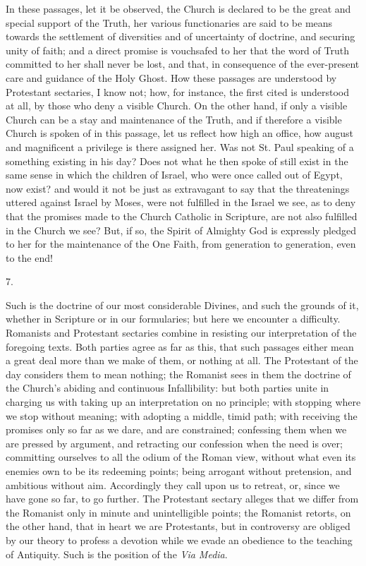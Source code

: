 In these passages, let it be observed, the Church is declared to be
the great and special support of the Truth, her various functionaries
are said to be means towards the settlement of diversities and of
uncertainty of doctrine, and securing unity of faith; and a direct
promise is vouchsafed to her that the word of Truth committed to her
shall never be lost, and that, in consequence of the ever-present care
and guidance of the Holy Ghost. How these passages are understood by
Protestant sectaries, I know not; how, for instance, the first cited
is understood at all, by those who deny a visible Church. On the other
hand, if only a visible Church can be a stay and maintenance of the
Truth, and if therefore a visible Church is spoken of in this
passage, let us reflect how high an office, how august and magnificent
a privilege is there assigned her. Was not St. Paul speaking of a
something existing in his day? Does not what he then spoke of still
exist in the same sense in which the children of Israel, who were once
called out of Egypt, now exist? and would it not be just as
extravagant to say that the threatenings uttered against Israel by
Moses, were not fulfilled in the Israel we see, as to deny that the
promises made to the Church Catholic in Scripture, are not also
fulfilled in the Church we see? But, if so, the Spirit of Almighty God
is expressly pledged to her for the maintenance of the One Faith, from
generation to generation, even to the end!

7.

Such is the doctrine of our most considerable Divines, and such the
grounds of it, whether in Scripture or in our formularies; but here we
encounter a difficulty. Romanists and Protestant sectaries combine in
resisting our interpretation of the foregoing texts. Both parties
agree as far as this, that such passages either mean a great deal more
than we make of them, or nothing at all. The Protestant of the day
considers them to mean nothing; the Romanist sees in them the doctrine
of the Church's abiding and continuous Infallibility: but both parties
unite in charging us with taking up an interpretation on no principle;
with stopping where we stop without meaning; with adopting a middle,
timid path; with receiving the promises only so far as we dare, and
are constrained; confessing them when we are pressed by argument, and
retracting our confession when the need is over; committing ourselves
to all the odium of the Roman view, without what even its enemies own
to be its redeeming points; being arrogant without pretension, and
ambitious without aim. Accordingly they call upon us to retreat,
or, since we have gone so far, to go further. The Protestant sectary
alleges that we differ from the Romanist only in minute and
unintelligible points; the Romanist retorts, on the other hand, that
in heart we are Protestants, but in controversy are obliged by our
theory to profess a devotion while we evade an obedience to the
teaching of Antiquity. Such is the position of the \emph{Via Media}.

